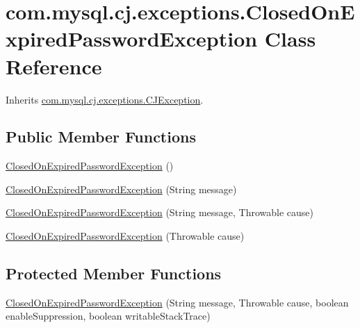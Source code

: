 \hypertarget{classcom_1_1mysql_1_1cj_1_1exceptions_1_1_closed_on_expired_password_exception}{}\section{com.\+mysql.\+cj.\+exceptions.\+Closed\+On\+Expired\+Password\+Exception Class Reference}
\label{classcom_1_1mysql_1_1cj_1_1exceptions_1_1_closed_on_expired_password_exception}


Inherits \mbox{\hyperlink{classcom_1_1mysql_1_1cj_1_1exceptions_1_1_c_j_exception}{com.\+mysql.\+cj.\+exceptions.\+C\+J\+Exception}}.

\subsection*{Public Member Functions}
\begin{DoxyCompactItemize}
\item 
\mbox{\hyperlink{classcom_1_1mysql_1_1cj_1_1exceptions_1_1_closed_on_expired_password_exception_ad93bc748da25e97da54dc2490276b222}{Closed\+On\+Expired\+Password\+Exception}} ()
\item 
\mbox{\hyperlink{classcom_1_1mysql_1_1cj_1_1exceptions_1_1_closed_on_expired_password_exception_ade81935a3553590a8ea5d0db213ef7fe}{Closed\+On\+Expired\+Password\+Exception}} (String message)
\item 
\mbox{\hyperlink{classcom_1_1mysql_1_1cj_1_1exceptions_1_1_closed_on_expired_password_exception_a5707cafa7b5502424ccc4e69c5508640}{Closed\+On\+Expired\+Password\+Exception}} (String message, Throwable cause)
\item 
\mbox{\hyperlink{classcom_1_1mysql_1_1cj_1_1exceptions_1_1_closed_on_expired_password_exception_a92563017b79ff810501ab63aa1357035}{Closed\+On\+Expired\+Password\+Exception}} (Throwable cause)
\end{DoxyCompactItemize}
\subsection*{Protected Member Functions}
\begin{DoxyCompactItemize}
\item 
\mbox{\hyperlink{classcom_1_1mysql_1_1cj_1_1exceptions_1_1_closed_on_expired_password_exception_ad6869873ce2abecf34755acfaf6bb19f}{Closed\+On\+Expired\+Password\+Exception}} (String message, Throwable cause, boolean enable\+Suppression, boolean writable\+Stack\+Trace)
\end{DoxyCompactItemize}
